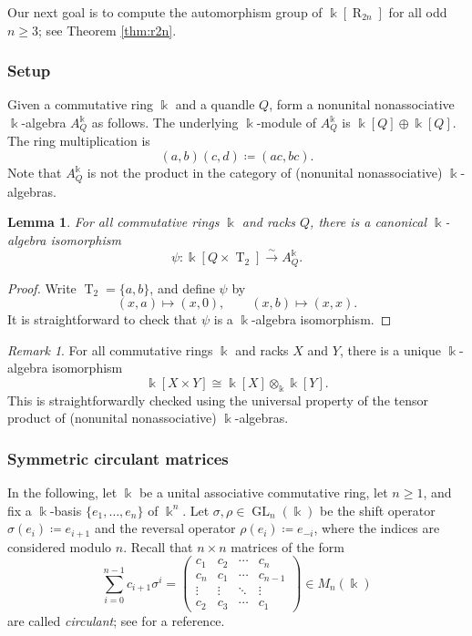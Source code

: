 \documentclass[12 pt]{amsart}
\newtheorem{lemma}[theorem]{Lemma}
\theoremstyle{definition}
\theoremstyle{remark}
\newtheorem{remark}[theorem]{Remark}
\numberwithin{equation}{section}
\newcommand{\T}{\operatorname{T}}
\newcommand{\R}{\operatorname{R}}
\newcommand{\GL}{\operatorname{GL}}
\newcommand{\bij}{\xrightarrow{\sim}}
\renewcommand{\k}{\Bbbk}
\begin{document}
Our next goal is to compute the automorphism group of $\k[\R_{2n}]$ for all odd $n\geq 3$; see Theorem \ref{thm:r2n}.

\subsubsection{Setup}

Given a commutative ring $\k$ and a quandle $Q$, form a nonunital nonassociative $\k$-algebra $A^\k_Q$ as follows. The underlying $\k$-module of $A_Q^\k$ is $\k[Q]\oplus \k[Q]$. The ring multiplication is 
\[
(a,b)(c,d)\coloneq(ac,bc).
\]
Note that $A^\k_Q$ is not the product in the category of (nonunital nonassociative) $\k$-algebras. 

\begin{lemma}\label{lem:ax}
    For all commutative rings $\k$ and racks $Q$, there is a canonical $\k$-algebra isomorphism 
\[
\psi\colon \k[Q\times \T_2]\bij A_Q^\k.
\]
\end{lemma}

\begin{proof}
    Write $\T_2=\{a,b\}$, and define $\psi$ by
\[
(x,a)\mapsto(x,0),\qquad (x,b)\mapsto (x,x).
\]
It is straightforward to check that $\psi$ is a $\k$-algebra isomorphism.
\end{proof}

\begin{remark}
    For all commutative rings $\k$ and racks $X$ and $Y$, there is a unique $\k$-algebra isomorphism
\[
\k[X\times Y]\cong \k[X]\otimes_{\k}\k[Y].
\]
This is straightforwardly checked using the universal property of the tensor product of (nonunital nonassociative) $\k$-algebras.
\end{remark}

\subsubsection{Symmetric circulant matrices}

In the following, let $\k$ be a unital associative commutative ring, let $n\geq 1$, and fix a $\k$-basis $\{e_1,\dots,e_n\}$ of $\k^n$. 
Let $\sigma,\rho\in\GL_n(\k)$ be the shift operator $\sigma(e_i)\coloneq e_{i+1}$ and the reversal operator $\rho(e_i)\coloneq e_{-i}$, where the indices are considered modulo $n$. 
Recall that $n\times n$ matrices of the form
\[
\sum^{n-1}_{i=0}c_{i+1}\sigma^i=\begin{pmatrix}
    c_1&c_2&\cdots &c_n\\
    c_n&c_1&\cdots&c_{n-1}\\
    \vdots&\vdots&\ddots&\vdots\\
    c_2&c_3&\cdots&c_1
\end{pmatrix}\in M_n(\k)
\]
are called \emph{circulant}; see \cite{circulant} for a reference. 
\end{document}
